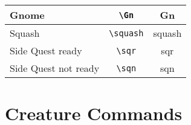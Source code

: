 \documentclass[a4paper,openany]{book}
\begin{document}
\begin{multicols}{2}
\begin{tabularx}{\linewidth}{Xcc}
  Gnome & {\tt \textbackslash{Gn}} & \gls{Gn} \\
  \hline
  Squash & {\tt \textbackslash{squash}} & \gls{squash} \\

  Side Quest ready & {\tt \textbackslash{sqr}} & \gls{sqr} \\

  Side Quest not ready & {\tt \textbackslash{sqn}} & \gls{sqn} \\

\end{tabularx}

\end{multicols}

\section{Creature Commands}
\end{document}
